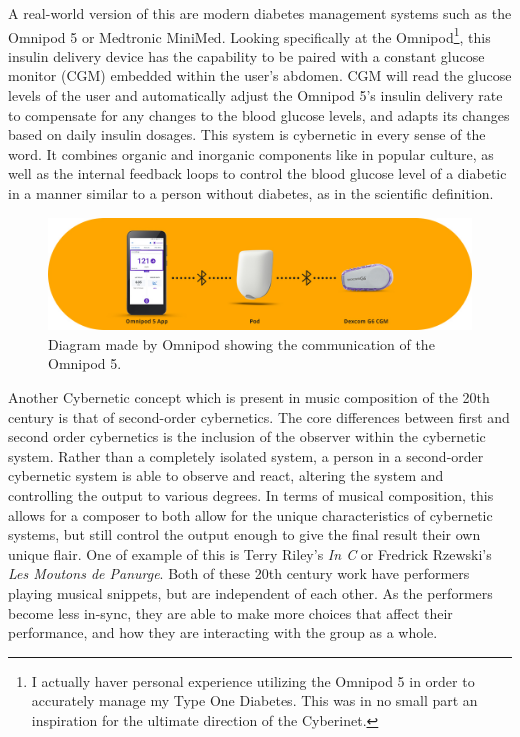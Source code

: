 A real-world version of this are modern diabetes management systems such as the Omnipod 5 or Medtronic MiniMed. Looking specifically at the Omnipod\footnote{I actually haver personal experience utilizing the Omnipod 5 in order to accurately manage my Type One Diabetes. This was in no small part an inspiration for the ultimate direction of the Cyberinet.}, this insulin delivery device has the capability to be paired with a constant glucose monitor (CGM) embedded within the user's abdomen. CGM will read the glucose levels of the user and automatically adjust the Omnipod 5's insulin delivery rate to compensate for any changes to the blood glucose levels, and adapts its changes based on daily insulin dosages. This system is cybernetic in every sense of the word. It combines organic and inorganic components like in popular culture, as well as the internal feedback loops to control the blood glucose level of a diabetic in a manner similar to a person without diabetes, as in the scientific definition.

\begin{figure} %
    \centering
    \includegraphics[scale=0.4]{diagrams/Omnipod-5_CGM_Pod_BT_1040x277.jpg}
    \caption{Diagram made by Omnipod showing the communication of the Omnipod 5.}
    \label{fig:omnipod}
\end{figure}


Another Cybernetic concept which is present in music composition of the 20th century is that of second-order cybernetics. The core differences between first and second order cybernetics is the inclusion of the observer within the cybernetic system. Rather than a completely isolated system, a person in a second-order cybernetic system is able to observe and react, altering the system and controlling the output to various degrees. In terms of musical composition, this allows for a composer to both allow for the unique characteristics of cybernetic systems, but still control the output enough to give the final result their own unique flair. One of example of this is Terry Riley's \textit{In C} or Fredrick Rzewski's \textit{Les Moutons de Panurge}. Both of these 20th century work have performers playing musical snippets, but are independent of each other. As the performers become less in-sync, they are able to make more choices that affect their performance, and how they are interacting with the group as a whole.

